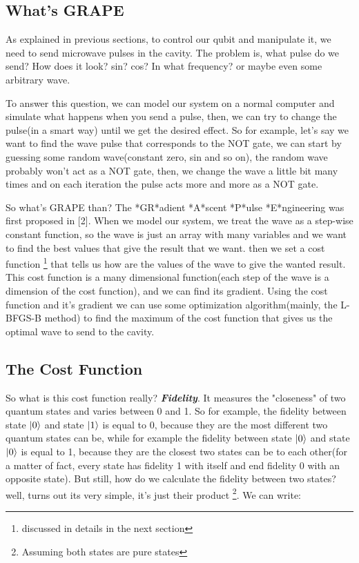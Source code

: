 \documentclass{article}
\numberwithin{equation}{section} %
\begin{document}
\subsection{What's GRAPE} %
As explained in previous sections, to control our qubit and manipulate it, we need to send microwave pulses in the cavity. The problem is, what pulse do we send? How does it look? sin? cos? In what frequency? or maybe even some arbitrary wave. \par
To answer this question, we can model our system on a normal computer and simulate what happens when you send a pulse, then, we can try to change the pulse(in a smart way) until we get the desired effect. So for example, let's say we want to find the wave pulse that corresponds to the NOT gate, we can start by guessing some random wave(constant zero, sin and so on), the random wave probably won't act as a NOT gate, then, we change the wave a little bit many times and on each iteration the pulse acts more and more as a NOT gate.\par
So what's GRAPE than? The *GR*adient *A*scent *P*ulse *E*ngineering was first proposed in [2]. When we model our system, we treat the wave as a step-wise constant function, so the wave is just an array with many variables and we want to find the best values that give the result that we want. then we set a cost function \footnote{discussed in details in the next section} that tells us how are the values of the wave to give the wanted result. This cost function is a many dimensional function(each step of the wave is a dimension of the cost function), and we can find its gradient. Using the cost function and it's gradient we can use some optimization algorithm(mainly, the L-BFGS-B method) to find the maximum of the cost function that gives us the optimal wave to send to the cavity.

\subsection{The Cost Function}
So what is this cost function really? \textit{\textbf{Fidelity}}. It measures the "closeness" of two quantum states and varies between 0 and 1. So for example, the fidelity between state $\ket{0}$ and state $\ket{1}$ is equal to 0, because they are the most different two quantum states can be, while for example the fidelity between state $\ket{0}$ and state $\ket{0}$ is equal to 1, because they are the closest two states can be to each other(for a matter of fact, every state has fidelity 1 with itself and end fidelity 0 with an opposite state). But still, how do we calculate the fidelity between two states? well, turns out its very simple, it's just their product \footnote{Assuming both states are pure states}. We can write:
\end{document}
